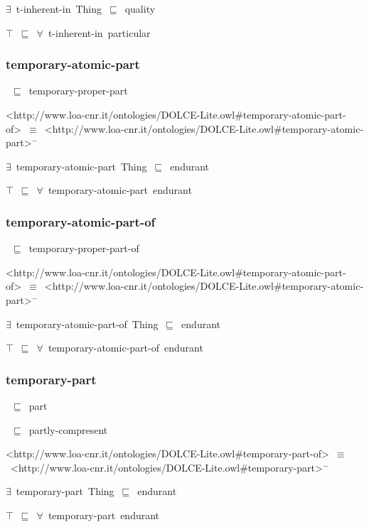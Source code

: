 \documentclass{article}
\begin{document}
\ensuremath{\exists}~t-inherent-in~Thing~\ensuremath{\sqsubseteq}~quality

\ensuremath{\top}~\ensuremath{\sqsubseteq}~\ensuremath{\forall}~t-inherent-in~particular

\subsubsection*{temporary-atomic-part}

~\ensuremath{\sqsubseteq}~temporary-proper-part

<http://www.loa-cnr.it/ontologies/DOLCE-Lite.owl#temporary-atomic-part-of>~\ensuremath{\equiv}~<http://www.loa-cnr.it/ontologies/DOLCE-Lite.owl#temporary-atomic-part>\ensuremath{^-}

\ensuremath{\exists}~temporary-atomic-part~Thing~\ensuremath{\sqsubseteq}~endurant

\ensuremath{\top}~\ensuremath{\sqsubseteq}~\ensuremath{\forall}~temporary-atomic-part~endurant

\subsubsection*{temporary-atomic-part-of}

~\ensuremath{\sqsubseteq}~temporary-proper-part-of

<http://www.loa-cnr.it/ontologies/DOLCE-Lite.owl#temporary-atomic-part-of>~\ensuremath{\equiv}~<http://www.loa-cnr.it/ontologies/DOLCE-Lite.owl#temporary-atomic-part>\ensuremath{^-}

\ensuremath{\exists}~temporary-atomic-part-of~Thing~\ensuremath{\sqsubseteq}~endurant

\ensuremath{\top}~\ensuremath{\sqsubseteq}~\ensuremath{\forall}~temporary-atomic-part-of~endurant

\subsubsection*{temporary-part}

~\ensuremath{\sqsubseteq}~part

~\ensuremath{\sqsubseteq}~partly-compresent

<http://www.loa-cnr.it/ontologies/DOLCE-Lite.owl#temporary-part-of>~\ensuremath{\equiv}~<http://www.loa-cnr.it/ontologies/DOLCE-Lite.owl#temporary-part>\ensuremath{^-}

\ensuremath{\exists}~temporary-part~Thing~\ensuremath{\sqsubseteq}~endurant

\ensuremath{\top}~\ensuremath{\sqsubseteq}~\ensuremath{\forall}~temporary-part~endurant
\end{document}
